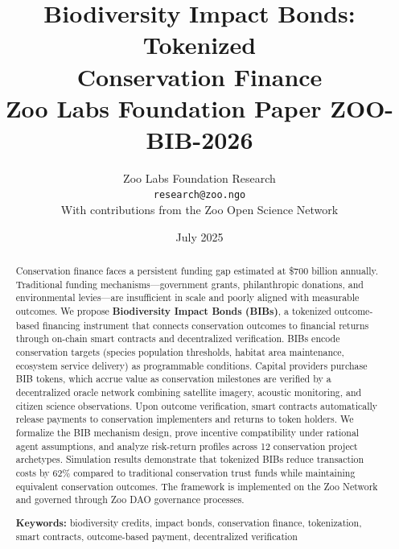 \documentclass[11pt,a4paper]{article}
\title{%
  \textbf{Biodiversity Impact Bonds: Tokenized\\Conservation Finance}\\[0.5em]
  \large Zoo Labs Foundation Paper ZOO-BIB-2026
}
\author{
  Zoo Labs Foundation Research\\
  \texttt{research@zoo.ngo}\\[0.5em]
  \small With contributions from the Zoo Open Science Network
}
\date{July 2025}
\begin{document}
\zoocoverpage

\begin{abstract}
\noindent
Conservation finance faces a persistent funding gap estimated at
\$700 billion annually. Traditional funding mechanisms---government
grants, philanthropic donations, and environmental levies---are
insufficient in scale and poorly aligned with measurable outcomes. We
propose \textbf{Biodiversity Impact Bonds (BIBs)}, a tokenized
outcome-based financing instrument that connects conservation outcomes
to financial returns through on-chain smart contracts and decentralized
verification. BIBs encode conservation targets (species population
thresholds, habitat area maintenance, ecosystem service delivery) as
programmable conditions. Capital providers purchase BIB tokens, which
accrue value as conservation milestones are verified by a decentralized
oracle network combining satellite imagery, acoustic monitoring, and
citizen science observations. Upon outcome verification, smart contracts
automatically release payments to conservation implementers and returns
to token holders. We formalize the BIB mechanism design, prove incentive
compatibility under rational agent assumptions, and analyze risk-return
profiles across 12 conservation project archetypes. Simulation results
demonstrate that tokenized BIBs reduce transaction costs by 62\%
compared to traditional conservation trust funds while maintaining
equivalent conservation outcomes. The framework is implemented on the
Zoo Network and governed through Zoo DAO governance processes.

\medskip
\noindent\textbf{Keywords:} biodiversity credits, impact bonds,
conservation finance, tokenization, smart contracts, outcome-based
payment, decentralized verification
\end{abstract}

\newpage
\tableofcontents
\newpage














\end{document}
